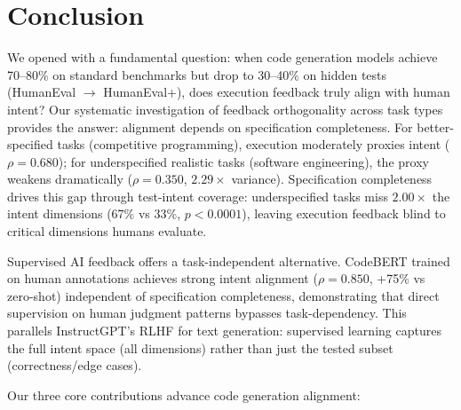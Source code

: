 \section{Conclusion}

We opened with a fundamental question: when code generation models achieve 70--80\% on standard benchmarks but drop to 30--40\% on hidden tests (HumanEval $\rightarrow$ HumanEval+), does execution feedback truly align with human intent? Our systematic investigation of feedback orthogonality across task types provides the answer: alignment depends on specification completeness. For better-specified tasks (competitive programming), execution moderately proxies intent ($\rho=0.680$); for underspecified realistic tasks (software engineering), the proxy weakens dramatically ($\rho=0.350$, $2.29\times$ variance). Specification completeness drives this gap through test-intent coverage: underspecified tasks miss $2.00\times$ the intent dimensions (67\% vs 33\%, $p<0.0001$), leaving execution feedback blind to critical dimensions humans evaluate.

Supervised AI feedback offers a task-independent alternative. CodeBERT trained on human annotations achieves strong intent alignment ($\rho=0.850$, +75\% vs zero-shot) independent of specification completeness, demonstrating that direct supervision on human judgment patterns bypasses task-dependency. This parallels InstructGPT's RLHF for text generation: supervised learning captures the full intent space (all dimensions) rather than just the tested subset (correctness/edge cases).

Our three core contributions advance code generation alignment:

